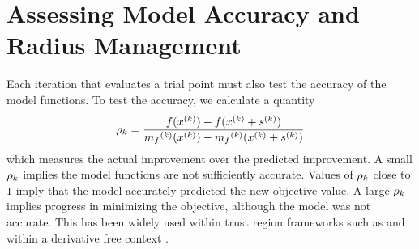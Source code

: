 %
%



\section{Assessing Model Accuracy and Radius Management}
\label{rhosection}
Each iteration that evaluates a trial point must also test the accuracy of the model functions.
To test the accuracy, we calculate a quantity
\begin{align}
\label{define_rhok}
\rho_k = \frac{f(x^{(k)}) - f(x^{(k)}+{{s}^{(k)}})}{{{m}_f}^{(k)}(x^{(k)}) - {{m}_f}^{(k)}(x^{(k)}+{{s}^{(k)}})}
\end{align}
which measures the actual improvement over the predicted improvement.
A small $\rho_k$ implies the model functions are not sufficiently accurate.
Values of $\rho_k$ close to $1$ imply that the model accurately predicted the new objective value.
A large $\rho_k$ implies progress in minimizing the objective, although the model was not accurate.
This has been widely used within trust region frameworks such as \cite{Conn:2000:TM:357813} and within a derivative free context \cite{introduction_book}.

